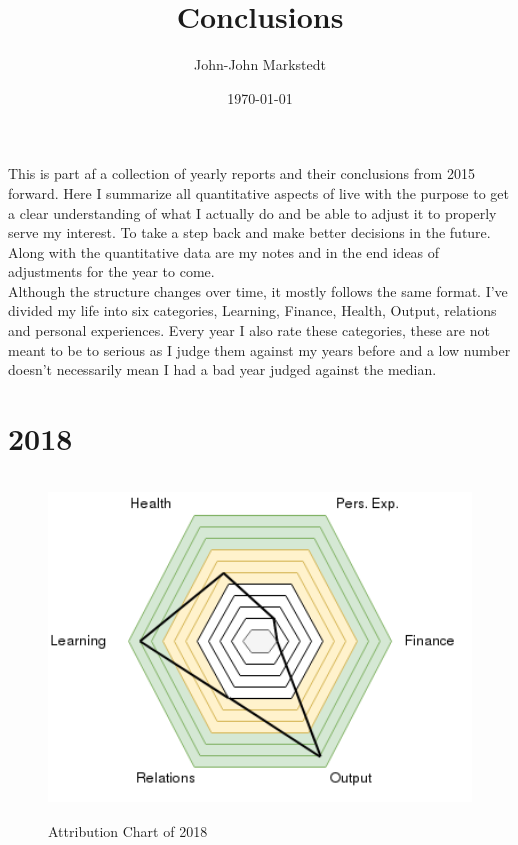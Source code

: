 \documentclass[a4paper]{article}
\title{Conclusions}
\author{John-John Markstedt}
\date{\today}
\begin{document}
	\maketitle
	
	This is part af a collection of yearly reports and their conclusions from 2015 forward. Here I summarize all quantitative aspects of live with the purpose to get a clear understanding of what I actually do and be able to adjust it to properly serve my interest. To take a step back and make better decisions in the future. Along with the quantitative data are my notes and in the end ideas of adjustments for the year to come. \\
	Although the structure changes over time, it mostly follows the same format. I've divided my life into six categories, Learning, Finance, Health, Output, relations and personal experiences. Every year I also rate these categories, these are not meant to be to serious as I judge them against my years before and a low number doesn't necessarily mean I had a bad year judged against the median. 
	
	
	\clearpage
	
	\section{2018}
	
	\begin{figure}[h!]
		\includegraphics[height=255pt]{Attributes_Chart_2018.png}
		\caption{Attribution Chart of 2018}
		\label{fig:2018}
	\end{figure} 
	
\end{document}
